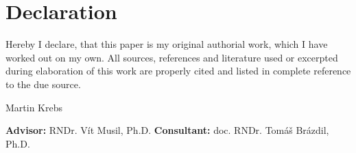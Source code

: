 \chapter*{Declaration}

\noindent
Hereby I declare, that this paper is my original authorial work, which I
have worked out on my own. All sources, references and literature used or
excerpted during elaboration of this work are properly cited and listed in
complete reference to the due source.

\vspace{1cm}
\begin{flushright}
    Martin Krebs
\end{flushright}
\vfill
\textbf{Advisor:} RNDr. Vít Musil, Ph.D.
\newline
\textbf{Consultant:} doc. RNDr. Tomáš Brázdil, Ph.D.
